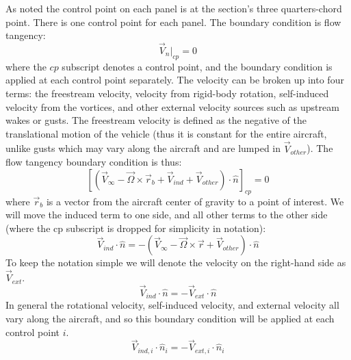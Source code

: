 \documentclass{article}
\begin{document}
As noted the control point on each panel is at the section's three quarters-chord point.  There is one control point for each panel.  The boundary condition is flow tangency:
\begin{equation}
    \vec{V}_n|_{cp} = 0
\end{equation}
where the $cp$ subscript denotes a control point, and the boundary condition is applied at each control point separately.  The velocity can be broken up into four terms: the freestream velocity, velocity from rigid-body rotation, self-induced velocity from the vortices, and other external velocity sources such as upstream wakes or gusts.  The freestream velocity is defined as the negative of the translational motion of the vehicle (thus it is constant for the entire aircraft, unlike gusts which may vary along the aircraft and are lumped in $\vec V_{other}$). The flow tangency boundary condition is thus:
\begin{equation}
    \left[(\vec{V}_\infty - \vec{\Omega} \times \vec{r}_b + \vec{V}_{ind} + \vec{V}_{other}) \cdot \hat{n} \right]_{cp}= 0
\end{equation}
where $\vec{r}_b$ is a vector from the aircraft center of gravity to a point of interest.  We will move the induced term to one side, and all other terms to the other side (where the cp subscript is dropped for simplicity in notation):
\begin{equation}
    \vec{V}_{ind} \cdot \hat{n} = - (\vec{V}_\infty - \vec{\Omega} \times \vec{r} +  \vec{V}_{other}) \cdot \hat{n}
\end{equation}
To keep the notation simple we will denote the velocity on the right-hand side as $\vec V_{ext}$.
\begin{equation}
\vec{V}_{ind} \cdot \hat{n} = - \vec{V}_{ext} \cdot \hat{n}
\end{equation}
In general the rotational velocity, self-induced velocity, and external velocity all vary along the aircraft, and so this boundary condition will be applied at each control point $i$.
\begin{equation}
\vec{V}_{ind, i} \cdot \hat{n}_i = - \vec{V}_{ext, i} \cdot \hat{n}_i
\label{eq:flowtangency}
\end{equation}
\end{document}
